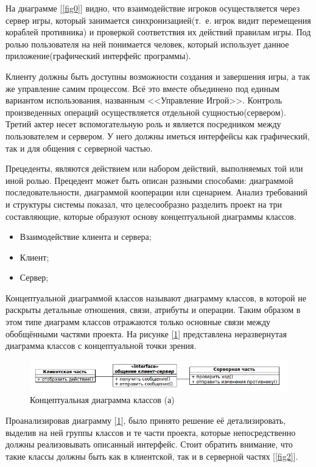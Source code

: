 На диаграмме [\ref{fig0}] видно, что взаимодействие игроков осуществляется через сервер игры, который
занимается синхронизацией(т.~е. игрок видит перемещения кораблей противника)
и проверкой соответствия их действий правилам игры. Под ролью пользователя на ней понимается 
человек, который использует данное приложение(графический интерфейс программы).

Клиенту должны быть доступны возможности создания и завершения игры, а так же управление самим процессом. Всё это вместе объединено под единым вариантом использования, названным <<Управление Игрой>>. Контроль произведенных операций осуществляется отдельной сущностью(сервером). Третий актер несет вспомогательную роль и является посредником между пользователем и сервером. У него должны иметься интерфейсы как графический, так и для общения с серверной частью. 

Прецеденты, являются действием или набором действий, выполняемых той или иной ролью. Прецедент может быть описан разными способами: диаграммой последовательности, диаграммой кооперации или сценарием.
Анализ требований и структуры системы показал, что целесообразно разделить проект на три составляющие, которые образуют основу концептуальной диаграммы классов. 
\begin{itemize}
	\item Взаимодействие клиента и сервера; 
	\item Клиент;
	\item Сервер;
\end{itemize} 

Концептуальной диаграммой классов называют диаграмму классов, в которой не раскрыты детальные отношения, связи, атрибуты и операции. Таким образом в этом типе диаграмм классов отражаются только основные связи между обобщёнными частями проекта. На рисунке [\ref{fig1}] представлена неразвернутая диаграмма классов с концептуальной точки зрения.
\begin{figure}[ht]
\centering
\includegraphics[width=17cm]{images/class.png}
\caption{Концептуальная диаграмма классов (а)}
\label{fig1}
\end{figure}

Проанализировав диаграмму [\ref{fig1}], было принято решение её детализировать, выделив на ней группы классов и те части проекта, которые непосредственно должны реализовывать описанный интерфейс. Стоит обратить внимание, что такие классы должны быть как в клиентской, так и в серверной частях [\ref{fig2}].

